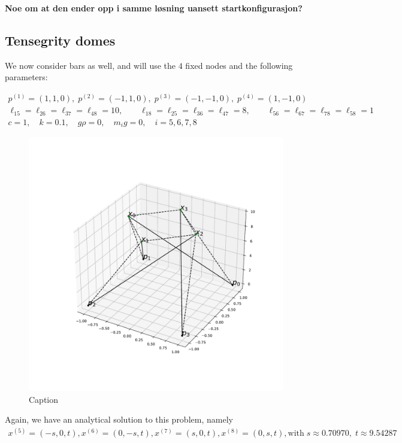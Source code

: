 \textbf{Noe om at den ender opp i samme løsning uansett startkonfigurasjon?}

\subsection{Tensegrity domes}
We now consider bars as well, and will use the $4$ fixed nodes and the following parameters:

\begin{equation*}
    \begin{gathered}
    p^{(1)} = (1,1,0),\; p^{(2)} = (-1,1,0),\; p^{(3)} = (-1,-1,0),\; p^{(4)} = (1,-1,0)\\
    \ell_{15} = \ell_{26} = \ell_{37} = \ell_{48} = 10, \qquad \ell_{18} = \ell_{25} = \ell_{36} = \ell_{47} = 8, \qquad \ell_{56} = \ell_{67} = \ell_{78} = \ell_{58} = 1\\
    c=1, \quad k= 0.1, \quad g \rho = 0,\quad m_i g = 0, \quad i = 5,6,7,8
    \end{gathered}
\end{equation*}

\begin{figure}
    \centering
    \includegraphics[width=0.6\columnwidth]{Bilder/P69.pdf}
    \caption{Caption}
    \label{P69}
\end{figure}
Again, we have an analytical solution to this problem, namely 
\begin{equation*}
    \begin{gathered}
    x^{(5)} = (-s,0,t),x^{(6)} = (0,-s,t),x^{(7)} = (s,0,t),x^{(8)} = (0,s,t),  \text{with}\; s \approx 0.70970, \; t \approx 9.54287
    \end{gathered}
\end{equation*}

